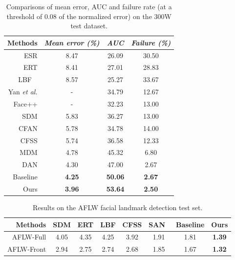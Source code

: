 \documentclass[10pt,journal,compsoc]{IEEEtran}
\begin{document}
\begin{table}[t!]
	\caption{Comparisons of mean error, AUC and failure rate (at a threshold of 0.08 of the normalized error) on the 300W test dataset.}
        \label{tab:Comparisons-of-AUC}
	\small
	\centering
	\setlength{\tabcolsep}{8.0pt}
	\renewcommand{\arraystretch}{1.1}
	\begin{tabular}{ r||c|c|c }
		\hline
			{Methods} & \emph{Mean error (\%)} & \emph{AUC} & \emph{Failure (\%)}  \\
		\hline
		\hline
		ESR \cite{cao2014face}  & 8.47  & 26.09   &  30.50  \\
		ERT\cite{kazemi2014one}   & 8.41  & 27.01   & 28.83   \\
		LBF ~\cite{ren2014face}\footnotemark[1]  	& 8.57   & 25.27   & 33.67    \\
		Yan \emph{et al.}\cite{yan2013learn} & -  & 34.79   & 12.67   \\
		Face++ \cite{zhou2013extensive}  & -  &  32.23  &  13.00  \\
		SDM \cite{xiong2013supervised}   & 5.83    & 36.27   & 13.00    \\
		CFAN \cite{zhang2014coarse}  & 5.78   & 34.78  & 14.00     \\
		CFSS \cite{zhu2015face}   & 5.74  & 36.58  &  12.33    \\
		MDM \cite{trigeorgis2016mnemonic}   & 4.78   & 45.32  & 6.80     \\
		DAN \cite{kowalski2017deep}   & 4.30   & 47.00   & 2.67     \\
		\hline
		\hline
		Baseline & \textbf{4.25}& \textbf{50.06}& \textbf{2.67}\\
		Ours & \textbf{3.96}& \textbf{53.64}& \textbf{2.50}\\
		\hline
	\end{tabular}
\end{table}


\begin{table}[!t]
 \caption{Results on the AFLW facial landmark detection test set.} \label{tab:AFLW}
%
 \small
 \centering
\setlength{\tabcolsep}{2.5pt}
 \renewcommand\arraystretch{1}
 \begin{tabular}{ r |c|c|c|c|c|c|c }
  \hline
  \multirow{1}{*}{Methods} & \multicolumn{1}{c}{SDM} & \multicolumn{1}{c}{ERT}  & \multicolumn{1}{c}{LBF} & \multicolumn{1}{c}{CFSS} & {SAN~\cite{dong2018style}} &\multicolumn{1}{c}{Baseline}  & \multicolumn{1}{c}{Ours}\\
  \hline
AFLW-Full  & \multicolumn{1}{c}{4.05} &  \multicolumn{1}{c}{4.35}  &  \multicolumn{1}{c}{4.25}  &  \multicolumn{1}{c}{3.92} &  {1.91} &  \multicolumn{1}{c}{1.81} &  \multicolumn{1}{c}{\textbf{1.39}}\\
AFLW-Front &  \multicolumn{1}{c}{2.94}  &  \multicolumn{1}{c}{2.75}  &  \multicolumn{1}{c}{2.74}  &  \multicolumn{1}{c}{2.68}&   {1.85} & \multicolumn{1}{c}{1.67}  &  \multicolumn{1}{c}{\textbf{1.32}}\\
  \hline
 \end{tabular}
\end{table}
\end{document}
